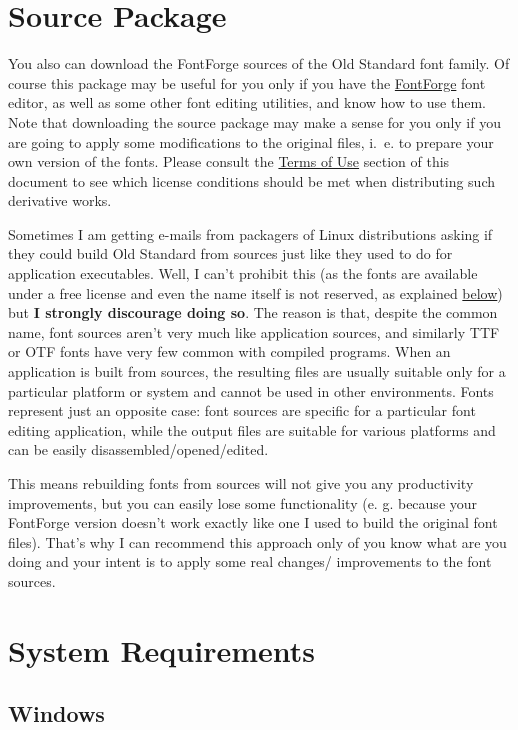 \documentclass[12pt,a4paper,openany]{book}
\begin{document}
\section{Source Package}

You also can download the FontForge sources of the Old Standard font family.
Of course this package may be useful for you only if you have the 
\href{http://fontforge.sourceforge.net}{FontForge} font editor, as well
as some other font editing utilities, and know how to use them.
Note that downloading the source package may make a sense for you only
if you are going to apply some modifications to the original files, i.~e.
to prepare your own version of the fonts. Please consult the 
\hyperlink{license}{Terms of Use} section of this document to see which
license conditions should be met when distributing such derivative works.

Sometimes I am getting e-mails from packagers of Linux distributions
asking if they could build Old Standard from sources just like they used to
do for application executables. Well, I can't prohibit this (as the fonts
are available under a free license and even the name itself is not reserved,
as explained \hyperlink{license}{below}) but \textbf{I strongly discourage
doing so}. The reason is that, despite the common name, font sources aren't
very much like application sources, and similarly TTF or OTF fonts have very
few common with compiled programs. When an application is built from sources,
the resulting files are usually suitable only for a particular platform or
system and cannot be used in other environments. Fonts represent just an
opposite case: font sources are specific for a particular font editing
application, while the output files are suitable for various platforms and
can be easily disassembled/opened/edited. 

This means rebuilding fonts from sources will not give you any productivity 
improvements, but you can easily lose some functionality (e. g. because 
your FontForge version doesn't work exactly like one I used to build the
original font files). That's why I can recommend this approach only of you
know what are you doing and your intent is to apply some real changes/
improvements to the font sources.

\section{System Requirements}

\subsection{Windows}
\end{document}

